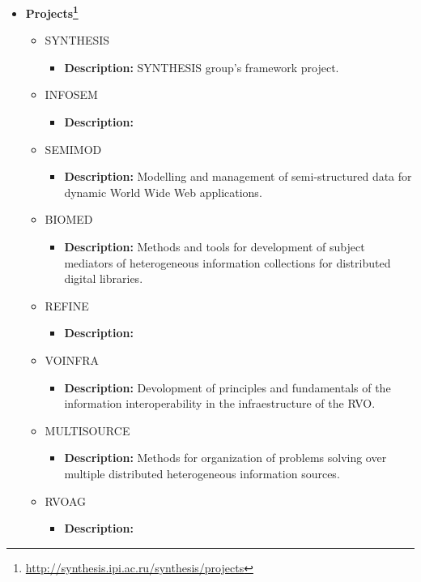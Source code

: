\begin{itemize}
\item \textbf{Projects\footnote{\url{http://synthesis.ipi.ac.ru/synthesis/projects}}}
	\begin{itemize}
		\item SYNTHESIS
			\begin{itemize}
				\item \textbf{Description:} SYNTHESIS group's framework
project.
			\end{itemize}
		\item INFOSEM
			\begin{itemize}
				\item \textbf{Description:}
			\end{itemize}
		\item SEMIMOD
			\begin{itemize}
				\item \textbf{Description:} Modelling and management of
semi-structured data for dynamic World Wide Web applications.
			\end{itemize}
		\item BIOMED
			\begin{itemize}
				\item \textbf{Description:} Methods and tools for development
of subject mediators of he\-te\-ro\-ge\-neous information collections for
distributed digital libraries.
			\end{itemize}
		\item REFINE
			\begin{itemize}
				\item \textbf{Description:}
			\end{itemize}
		\item VOINFRA
			\begin{itemize}
				\item \textbf{Description:} Devolopment of principles and
fundamentals of the information interoperability in the infraestructure of the
RVO.
			\end{itemize}
		\item MULTISOURCE
			\begin{itemize}
				\item \textbf{Description:} Methods for organization of
problems solving over multiple distributed he\-te\-ro\-ge\-neous information
sources.
			\end{itemize}
		\item RVOAG
			\begin{itemize}
				\item \textbf{Description:}

\end{itemize}
\end{itemize}
\end{itemize}

